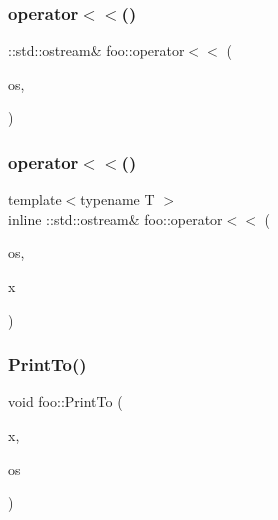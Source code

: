 \subsubsection{\texorpdfstring{operator$<$$<$()}{operator<<()}\hspace{0.1cm}{\footnotesize\ttfamily [1/2]}}
{\footnotesize\ttfamily \+::std\+::ostream\& foo\+::operator$<$$<$ (\begin{DoxyParamCaption}\item[{\+::std\+::ostream \&}]{os,  }\item[{const \hyperlink{structfoo_1_1_pointer_printable}{Pointer\+Printable} $\ast$}]{ }\end{DoxyParamCaption})}

\mbox{\label{namespacefoo_abe04f604d114085b0b9af25600ef00da}} 
\subsubsection{\texorpdfstring{operator$<$$<$()}{operator<<()}\hspace{0.1cm}{\footnotesize\ttfamily [2/2]}}
{\footnotesize\ttfamily template$<$typename T $>$ \\
inline \+::std\+::ostream\& foo\+::operator$<$$<$ (\begin{DoxyParamCaption}\item[{\+::std\+::ostream \&}]{os,  }\item[{const \hyperlink{classfoo_1_1_streamable_template_in_foo}{Streamable\+Template\+In\+Foo}$<$ T $>$ \&}]{x }\end{DoxyParamCaption})}

\mbox{\label{namespacefoo_ac435de653934c97045bbdba8c8afbe3f}} 
\subsubsection{\texorpdfstring{Print\+To()}{PrintTo()}\hspace{0.1cm}{\footnotesize\ttfamily [1/2]}}
{\footnotesize\ttfamily void foo\+::\+Print\+To (\begin{DoxyParamCaption}\item[{const \hyperlink{structfoo_1_1_printable_via_print_to}{Printable\+Via\+Print\+To} \&}]{x,  }\item[{\+::std\+::ostream $\ast$}]{os }\end{DoxyParamCaption})}

